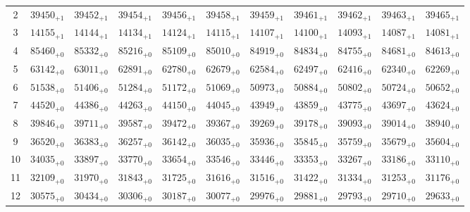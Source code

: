 \documentclass[10pt, a4paper]{article}
\begin{document}
\begin{center}
\begin{tabular}{c || c c c c c | c c c c c}
        2 & \({39450}_{+1}\) & \({39452}_{+1}\) & \({39454}_{+1}\) & \({39456}_{+1}\) & \({39458}_{+1}\) & \({39459}_{+1}\) & \({39461}_{+1}\) & \({39462}_{+1}\) & \({39463}_{+1}\) & \({39465}_{+1}\)\\
        3 & \({14155}_{+1}\) & \({14144}_{+1}\) & \({14134}_{+1}\) & \({14124}_{+1}\) & \({14115}_{+1}\) & \({14107}_{+1}\) & \({14100}_{+1}\) & \({14093}_{+1}\) & \({14087}_{+1}\) & \({14081}_{+1}\)\\
        4 & \({85460}_{+0}\) & \({85332}_{+0}\) & \({85216}_{+0}\) & \({85109}_{+0}\) & \({85010}_{+0}\) & \({84919}_{+0}\) & \({84834}_{+0}\) & \({84755}_{+0}\) & \({84681}_{+0}\) & \({84613}_{+0}\)\\
        5 & \({63142}_{+0}\) & \({63011}_{+0}\) & \({62891}_{+0}\) & \({62780}_{+0}\) & \({62679}_{+0}\) & \({62584}_{+0}\) & \({62497}_{+0}\) & \({62416}_{+0}\) & \({62340}_{+0}\) & \({62269}_{+0}\)\\
        \hline
        6 & \({51538}_{+0}\) & \({51406}_{+0}\) & \({51284}_{+0}\) & \({51172}_{+0}\) & \({51069}_{+0}\) & \({50973}_{+0}\) & \({50884}_{+0}\) & \({50802}_{+0}\) & \({50724}_{+0}\) & \({50652}_{+0}\)\\
        7 & \({44520}_{+0}\) & \({44386}_{+0}\) & \({44263}_{+0}\) & \({44150}_{+0}\) & \({44045}_{+0}\) & \({43949}_{+0}\) & \({43859}_{+0}\) & \({43775}_{+0}\) & \({43697}_{+0}\) & \({43624}_{+0}\)\\
        8 & \({39846}_{+0}\) & \({39711}_{+0}\) & \({39587}_{+0}\) & \({39472}_{+0}\) & \({39367}_{+0}\) & \({39269}_{+0}\) & \({39178}_{+0}\) & \({39093}_{+0}\) & \({39014}_{+0}\) & \({38940}_{+0}\)\\
        9 & \({36520}_{+0}\) & \({36383}_{+0}\) & \({36257}_{+0}\) & \({36142}_{+0}\) & \({36035}_{+0}\) & \({35936}_{+0}\) & \({35845}_{+0}\) & \({35759}_{+0}\) & \({35679}_{+0}\) & \({35604}_{+0}\)\\
        10 & \({34035}_{+0}\) & \({33897}_{+0}\) & \({33770}_{+0}\) & \({33654}_{+0}\) & \({33546}_{+0}\) & \({33446}_{+0}\) & \({33353}_{+0}\) & \({33267}_{+0}\) & \({33186}_{+0}\) & \({33110}_{+0}\)\\
        \hline
        11 & \({32109}_{+0}\) & \({31970}_{+0}\) & \({31843}_{+0}\) & \({31725}_{+0}\) & \({31616}_{+0}\) & \({31516}_{+0}\) & \({31422}_{+0}\) & \({31334}_{+0}\) & \({31253}_{+0}\) & \({31176}_{+0}\)\\
        12 & \({30575}_{+0}\) & \({30434}_{+0}\) & \({30306}_{+0}\) & \({30187}_{+0}\) & \({30077}_{+0}\) & \({29976}_{+0}\) & \({29881}_{+0}\) & \({29793}_{+0}\) & \({29710}_{+0}\) & \({29633}_{+0}\)\\

\end{tabular}
\end{center}
\end{document}
